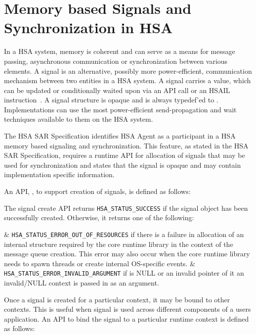 \hypertarget{signals}{}\section{Memory based Signals and
Synchronization in H\-S\-A}\label{signals}

In a HSA system, memory is coherent and can serve as a means for
message passing, asynchronous communication or synchronization
between various elements.  A signal is an alternative, possibly more
power-efficient, communication mechanism between two entities in a
H\-S\-A system. A signal carries a value, which can be updated or
conditionally waited upon via an API call or an HSAIL
instruction~\cite{prm}. A signal structure is opaque and is
always typedef'ed to . 
Implementations can use the most power-efficient send-propagation
and wait techniques available to them on the HSA system.  

The HSA SAR Specification \cite{sar} identifies HSA Agent as a
participant in a HSA memory based signaling and synchronization.
This feature, as stated in the HSA SAR Specification, requires a
runtime API for allocation of signals that may be used for
synchronization and states that the signal is opaque and may contain
implementation specific information.  

An API, , to support
creation of signals, is defined as follows:



The signal create API returns \texttt{HSA\_STATUS\_SUCCESS} if the
signal object has been successfully created. Otherwise, it returns
one of the following:

\begin{easylist}
& \texttt{HSA\_STATUS\_ERROR\_OUT\_OF\_RESOURCES} if there is a failure
in allocation of an internal structure required by the core runtime
library in the context of the message queue creation. This error may
also occur when the core runtime library needs to spawn threads or
create internal OS-specific events. 
& \texttt{HSA\_STATUS\_ERROR\_INVALID\_ARGUMENT} if {\itshape
{}} is NULL or an invalid pointer of it an invalid/NULL
context is passed in as an argument.
\end{easylist}

Once a signal is created for a particular context, it may be bound
to other contexts. This is useful when signal is used across
different components of a users application. An API to bind the
signal to a particular runtime context is defined as follows:

